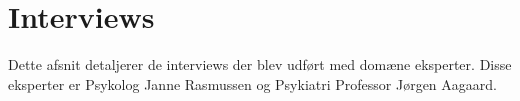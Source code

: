 \chapter{Interviews}
Dette afsnit detaljerer de interviews der blev udført med domæne eksperter. Disse eksperter er Psykolog Janne Rasmussen og Psykiatri Professor Jørgen Aagaard.
